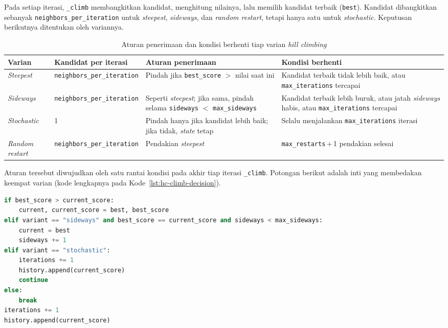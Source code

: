 Pada setiap iterasi, \texttt{\_climb} membangkitkan kandidat, menghitung nilainya, lalu memilih kandidat terbaik (\texttt{best}). Kandidat dibangkitkan sebanyak \texttt{neighbors\_per\_iteration} untuk \textit{steepest}, \textit{sideways}, dan \textit{random restart}, tetapi hanya satu untuk \textit{stochastic}. Keputusan berikutnya ditentukan oleh variannya.

\begin{table}[H]
    \centering
    \small
    \begin{tabular}{@{}p{2.6cm}p{2.3cm}p{4.2cm}p{4.6cm}@{}}
        \toprule
        Varian & Kandidat per iterasi & Aturan penerimaan & Kondisi berhenti \\
        \midrule
        \textit{Steepest} & \texttt{neighbors\_per\_iteration} & Pindah jika \texttt{best\_score} $>$ nilai saat ini & Kandidat terbaik tidak lebih baik, atau \texttt{max\_iterations} tercapai \\
        \textit{Sideways} & \texttt{neighbors\_per\_iteration} & Seperti \textit{steepest}; jika sama, pindah selama \texttt{sideways} $<$ \texttt{max\_sideways} & Kandidat terbaik lebih buruk, atau jatah \textit{sideways} habis, atau \texttt{max\_iterations} tercapai \\
        \textit{Stochastic} & 1 & Pindah hanya jika kandidat lebih baik; jika tidak, \textit{state} tetap & Selalu menjalankan \texttt{max\_iterations} iterasi \\
        \textit{Random restart} & \texttt{neighbors\_per\_iteration} & Pendakian \textit{steepest} & \texttt{max\_restarts}\,+\,1 pendakian selesai \\
        \bottomrule
    \end{tabular}
    \caption{Aturan penerimaan dan kondisi berhenti tiap varian \textit{hill climbing}}
    \label{tab:hc-rules}
\end{table}

Aturan tersebut diwujudkan oleh satu rantai kondisi pada akhir tiap iterasi \texttt{\_climb}. Potongan berikut adalah inti yang membedakan keempat varian (kode lengkapnya pada Kode~\ref{lst:hc-climb-decision}).

\begin{lstlisting}[language=Python, caption={Inti perbedaan antar-varian pada \texttt{\_climb}}, label={lst:hc-decision}]
if best_score > current_score:
    current, current_score = best, best_score
elif variant == "sideways" and best_score == current_score and sideways < max_sideways:
    current = best
    sideways += 1
elif variant == "stochastic":
    iterations += 1
    history.append(current_score)
    continue
else:
    break
iterations += 1
history.append(current_score)
\end{lstlisting}

